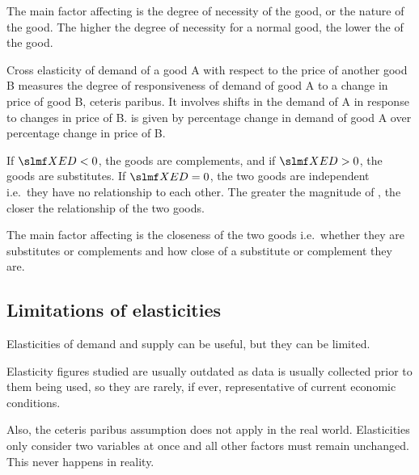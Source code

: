 \documentclass[Economics.tex]{subfiles}
\begin{document}
The main factor affecting \YED{} is the degree of necessity of the good, or the nature of the good. The higher the degree of necessity for a normal good, the lower the \YED{} of the good.

Cross elasticity of demand of a good A with respect to the price of another good B measures the degree of responsiveness of demand of good A to a change in price of good B, ceteris paribus. It involves shifts in the demand of A in response to changes in price of B. \XED{} is given by percentage change in demand of good A over percentage change in price of B.

If \(\XED < 0\), the goods are complements, and if \(\XED > 0\), the goods are substitutes. If \(\XED = 0\), the two goods are independent i.e.\ they have no relationship to each other. The greater the magnitude of \XED, the closer the relationship of the two goods.

The main factor affecting \XED{} is the closeness of the two goods i.e.\ whether they are substitutes or complements and how close of a substitute or complement they are.
\subsection{Limitations of elasticities}
Elasticities of demand and supply can be useful, but they can be limited.

Elasticity figures studied are usually outdated as data is usually collected prior to them being used, so they are rarely, if ever, representative of current economic conditions.

Also, the ceteris paribus assumption does not apply in the real world. Elasticities only consider two variables at once and all other factors must remain unchanged. This never happens in reality.
\end{document}
